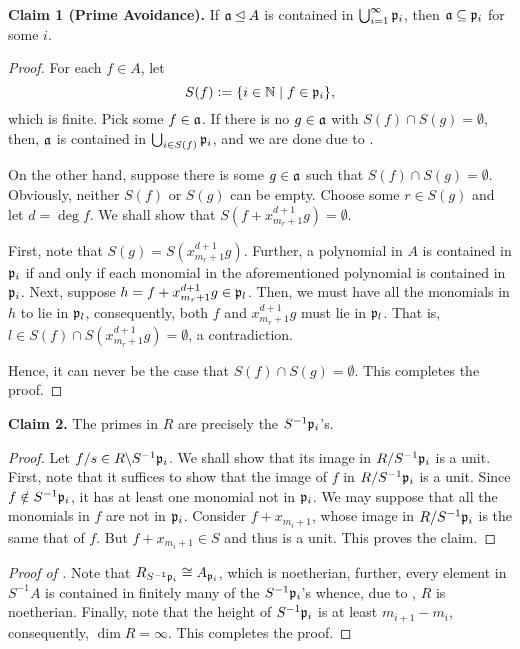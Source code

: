 \noindent\textbf{Claim 1 (Prime Avoidance).} If $\mathfrak a\unlhd A$ is contained in $\bigcup_{i = 1}^\infty\mathfrak p_i$, then $\mathfrak a\subseteq\mathfrak p_i$ for some $i$.
\begin{proof}
    For each $f\in A$, let 
    \begin{equation*}
        S(f) := \{i\in\mathbb{N}\mid f\in\mathfrak p_i\},
    \end{equation*}
    which is finite.
    Pick some $f\in\mathfrak a$. If there is no $g\in\mathfrak a$ with $S(f)\cap S(g) = \emptyset$, then, $\mathfrak a$ is contained in $\bigcup_{i\in S(f)}\mathfrak p_i$, and we are done due to .

    On the other hand, suppose there is some $g\in\mathfrak a$ such that $S(f)\cap S(g) = \emptyset$. Obviously, neither $S(f)$ or $S(g)$ can be empty. Choose some $r\in S(g)$ and let $d = \deg f$. We shall show that $S(f + x^{d + 1}_{m_r + 1}g) = \emptyset$.

    First, note that $S(g) = S(x^{d + 1}_{m_r + 1}g)$. Further, a polynomial in $A$ is contained in $\mathfrak p_i$ if and only if each monomial in the aforementioned polynomial is contained in $\mathfrak p_i$. Next, suppose $h = f + x^{d + 1}_{m_r + 1}g\in\mathfrak p_l$. Then, we must have all the monomials in $h$ to lie in $\mathfrak p_l$, consequently, both $f$ and $x^{d + 1}_{m_r + 1}g$ must lie in $\mathfrak p_l$. That is, $l\in S(f)\cap S(x^{d + 1}_{m_r + 1}g) = \emptyset$, a contradiction.

    Hence, it can never be the case that $S(f)\cap S(g) = \emptyset$. This completes the proof.
\end{proof}

\noindent\textbf{Claim 2.} The primes in $R$ are precisely the $S^{-1}\mathfrak p_i$'s.
\begin{proof}
    Let $f/s\in R\backslash S^{-1}\mathfrak p_i$. We shall show that its image in $R/S^{-1}\mathfrak p_i$ is a unit. First, note that it suffices to show that the image of $f$ in $R/S^{-1}\mathfrak p_i$ is a unit. Since $f\notin S^{-1}\mathfrak p_i$, it has at least one monomial not in $\mathfrak p_i$. We may suppose that all the monomials in $f$ are not in $\mathfrak p_i$. Consider $f + x_{m_i + 1}$, whose image in $R/S^{-1}\mathfrak p_i$ is the same that of $f$. But $f + x_{m_i + 1}\in S$ and thus is a unit. This proves the claim.
\end{proof}

\begin{proof}[Proof of ]
    Note that $R_{S^{-1}\mathfrak p_i}\cong A_{\mathfrak p_i}$, which is noetherian, further, every element in $S^{-1}A$ is contained in finitely many of the $S^{-1}\mathfrak p_i$'s whence, due to , $R$ is noetherian. Finally, note that the height of $S^{-1}\mathfrak p_i$ is at least $m_{i + 1} - m_i$, consequently, $\dim R = \infty$. This completes the proof.
\end{proof}

